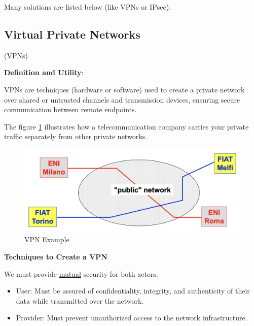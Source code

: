 Many solutions are listed below (like VPNs or IPsec).

\begin{center}
    \subsection{Virtual Private Networks}
\end{center}
\begin{center}
    (VPNs)
\end{center}

\textbf{Definition and Utility}:

\vspace{0.2cm}


\begin{multicols}{2}
\raggedcolumns
    VPNs are techniques (hardware or software) used to create a private network over shared or untrusted channels and transmission devices, ensuring secure communication between remote endpoints.

    The figure \ref{fig:vpn_definition} illustrates how a telecommunication company carries your private traffic separately from other private networks.
    
\columnbreak

\begin{figure}[H]
    \centering
    \includegraphics[width=\linewidth]{Images/NetSec/vpn_definition.png}
    \caption{VPN Example}
    \label{fig:vpn_definition}
    
\end{figure}
\end{multicols}

\textbf{Techniques to Create a VPN}

\vspace{0.2cm}

We must provide \underline{mutual} security for both actors.
\begin{itemize}
    \item User: Must be assured of confidentiality, integrity, and authenticity of their data while transmitted over the network.
    \item Provider: Must prevent unauthorized access to the network infrastructure.
\end{itemize}

